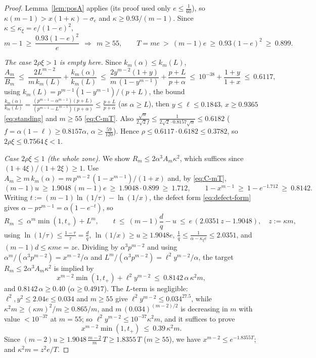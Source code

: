 \documentclass[11pt]{article}
\begin{document}
\begin{proof}
Lemma~\ref{lem:posA} applies (its proof used only $e\le\tfrac1{60}$), so
$\kappa(m-1)>x(1+\kappa)-\sigma_e$ and $\kappa\ge0.93/(m-1)$.  Since
$\kappa\le\kappa_\xi=e/(1-e)^2$,
\begin{equation}\label{eq:C-mT}
        m-1\ \ge\ \frac{0.93(1-e)^2}{e}\ \ \Rightarrow\ \
        m\ge55,
        \qquad
        T=me\ >\ (m-1)e\ \ge\ 0.93(1-e)^2\ \ge\ 0.899 .
\end{equation}

\emph{The case $2\rho\xi>1$ is empty here.}  Since
$k_m(\alpha)\le k_m(L)$,
\[
        \frac{A_m}{B_m}
        \ \le\ \frac{2L^{m-2}}{m\,k_m(L)}+\frac{k_m(\alpha)}{k_m(L)}
        \ \le\ \frac{2y^{m-2}(1+y)}{m\,(1-y^{m-1})}+\frac{p+L}{p+\alpha}
        \ \le\ 10^{-38}+\frac{1+y}{1+x}\ \le\ 0.6117,
\]
using $k_m(L)=p^{m-1}(1-y^{m-1})/(p+L)$, the bound
$\frac{k_m(\alpha)}{k_m(L)}=\frac{(p^{m-1}-\alpha^{m-1})(p+L)}
{(p^{m-1}-L^{m-1})(p+\alpha)}\le\frac{p+L}{p+\alpha}$ (as $\alpha\ge L$),
then $y\le\ell\le0.1843$, $x\ge0.9365$ \eqref{eq:standing} and $m\ge55$
\eqref{eq:C-mT}.  Also
$\frac{\sqrt\alpha}{2\sqrt2f}\le\frac1{2\sqrt2\cdot0.8157\sqrt\alpha}
\le0.6182$ ($f=\alpha(1-\ell)\ge0.8157\alpha$,
$\alpha\ge\tfrac{59}{120}$).  Hence
$\rho\le0.6117\cdot0.6182\le0.3782$, so $2\rho\xi\le0.7564\,\xi<1$.

\emph{Case $2\rho\xi\le1$ (the whole zone).}  We show
$R_m\le2\alpha^3A_m\kappa^2$, which suffices since $(1+4\xi)/(1+2\xi)\ge1$.
Use $A_m\ge m\,k_m(\alpha)=m\,p^{m-2}\,(1-x^{m-1})/(1+x)$ and, by
\eqref{eq:C-mT},
\[
        (m-1)u\ \ge\ 1.9048\,(m-1)e\ \ge\ 1.9048\cdot0.899\ \ge\ 1.712,
        \qquad
        1-x^{m-1}\ \ge\ 1-e^{-1.712}\ \ge\ 0.8142 .
\]
Writing $t:=(m-1)\ln(1/\tau)-\ln(1/x)$, the defect form
\eqref{eq:defect-form} gives $\alpha-p\tau^{m-1}=\alpha(1-e^{-t})$, so
\[
        R_m\ \le\ \alpha^m\min(1,t_+)+L^m,
        \qquad
        t\ \le\ (m-1)\frac dq-u\ \le\ e\,(2.0351\,z-1.9048),
        \quad z:=\kappa m,
\]
using $\ln(1/\tau)\le\frac{1-\tau}\tau=\frac dq$, $\ln(1/x)\ge u\ge1.9048e$,
$\frac1q\le\frac1{\alpha-\kappa_\xi e}\le2.0351$, and $(m-1)d\le\kappa me=ze$.
Dividing by $\alpha^3p^{m-2}$ and using
$\alpha^m/(\alpha^3p^{m-2})=x^{m-2}/\alpha$ and
$L^m/(\alpha^3p^{m-2})=\ell^2y^{m-2}/\alpha$, the target
$R_m\le2\alpha^3A_m\kappa^2$ is implied by
\[
        x^{m-2}\min(1,t_+)+\ell^2y^{m-2}
        \ \le\ 0.8142\,\alpha\,\kappa^2m ,
\]
and $0.8142\,\alpha\ge0.40$ ($\alpha\ge0.4917$).  The $L$-term is
negligible: $\ell^2,y^2\le2.04e\le0.034$ and $m\ge55$ give
$\ell^2y^{m-2}\le0.034^{27.5}$, while
$\kappa^2m\ge(\kappa m)^2/m\ge0.865/m$, and
$m\,(0.034)^{(m-2)/2}$ is decreasing in $m$ with value $<10^{-37}$ at
$m=55$; so $\ell^2y^{m-2}\le10^{-37}\kappa^2m$, and it suffices to prove
\begin{equation}\label{eq:C-battle}
        x^{m-2}\min(1,t_+)\ \le\ 0.39\,\kappa^2m .
\end{equation}
Since $(m-2)u\ge1.9048\,\tfrac{m-2}{m}\,T\ge1.8355\,T$ ($m\ge55$), we have
$x^{m-2}\le e^{-1.8355T}$; and $\kappa^2m=z^2e/T$.


\end{proof}
\end{document}
